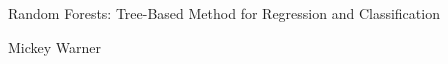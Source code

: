 \begin{center}
\begin{LARGE}
Random Forests: Tree-Based Method for Regression and Classification
\end{LARGE}

\bigskip
\bigskip

\begin{Large}
Mickey Warner
\end{Large}

\end{center}
